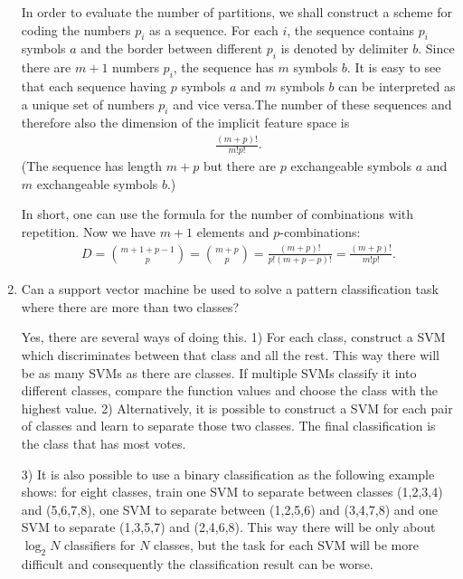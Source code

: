 \begin{enumerate}
\begin{solution}
    In order to evaluate the number of partitions, we shall construct a
    scheme for coding the numbers $p_i$ as a sequence.  For each $i$,
    the sequence contains $p_i$ symbols $a$ and the border between
    different $p_i$ is denoted by delimiter $b$.  Since there are $m+1$
    numbers $p_i$, the sequence has $m$ symbols $b$.  It is easy to see
    that each sequence having $p$ symbols $a$ and $m$ symbols $b$ can be
    interpreted as a unique set of numbers $p_i$ and vice versa.The
    number of these sequences and therefore also the dimension of the
    implicit feature space is
    \begin{align*}
      \frac{(m+p)!}{m!p!}.
    \end{align*}
    (The sequence has length $m+p$ but there are $p$ exchangeable
    symbols $a$ and $m$ exchangeable symbols $b$.)
    
    In short, one can use the formula for the number of combinations
    with repetition.  Now we have $m+1$ elements and $p$-combinations:
    \begin{align*}
      D = \binom{m+1+p-1}{p} = \binom{m+p}{p} =
      \frac{(m+p)!}{p!(m+p-p)!}  = \frac{(m+p)!}{m!p!}.
    \end{align*}
  \end{solution}
  

\item Can a support vector machine be used to solve a pattern
  classification task where there are more than two classes?

  \begin{solution}

    Yes, there are several ways of doing this.  1) For each class, construct a
    SVM which discriminates between that class and all the rest.  This way there
    will be as many SVMs as there are classes.  If multiple SVMs classify it
    into different classes, compare the function values and choose the class
    with the highest value.  2) Alternatively, it is possible to construct a SVM
    for each pair of classes and learn to separate those two classes.  The final
    classification is the class that has most votes.
    
    3) It is also possible to use a binary classification as the following
    example shows: for eight classes, train one SVM to separate between classes
    (1,2,3,4) and (5,6,7,8), one SVM to separate between (1,2,5,6) and (3,4,7,8)
    and one SVM to separate (1,3,5,7) and (2,4,6,8).  This way there will be
    only about $\log_2 N$ classifiers for $N$ classes, but the task for each SVM
    will be more difficult and consequently the classification result can be
    worse.


\end{solution}
\end{enumerate}

